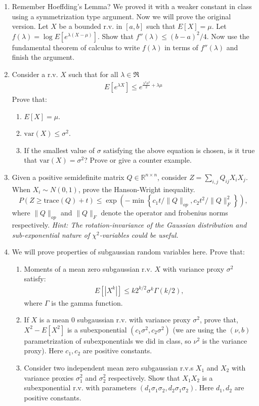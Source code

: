 \documentclass[11pt]{article}
\newcommand{\var}{\text{var}}
\begin{document}
\begin{enumerate}
\item Remember Hoeffding's Lemma? We proved it with a weaker constant in class using a symmetrization type argument. Now we will prove the original version. Let $X$ be a bounded r.v. in $[a,b]$ such that $E[X]=\mu$.
Let $f(\lambda)=\log E[e^{\lambda(X-\mu)}]$. Show that $f''(\lambda)\leq (b-a)^2/4$. Now use the fundamental theorem of calculus to write $f(\lambda)$ in terms of $f''(\lambda)$ and finish the argument.
\item Consider a r.v. $X$ such that for all $\lambda\in \Re$
\begin{align}
E[e^{\lambda X}]\leq e^{\frac{\lambda^2\sigma^2}{2}+\lambda\mu}
\end{align}
Prove that:
\begin{enumerate}
	\item $E[X]=\mu$.
	\item $\var(X)\leq \sigma^2$.
	\item If the smallest value of $\sigma$ satisfying the above equation is chosen, is it true that $\var(X)=\sigma^2$? Prove or give a counter example.
\end{enumerate}
\item Given a positive semidefinite matrix $Q\in \mathbb{R}^{n\times n}$, consider $Z=\sum_{i,j}Q_{ij}X_iX_j$. When $X_i\sim N(0,1)$, prove the Hanson-Wright inequality.
$$P\left(Z\ge \text{trace}(Q)+ t\right)\leq \exp\left(-\min\left\{c_1 t/\|Q\|_{op},c_2 t^2/\|Q\|_F^2\right\}\right),$$
where $\|Q\|_{op}$ and $\|Q\|_{F}$ denote the operator and frobenius norms respectively. \textit{Hint: The rotation-invariance of the
 Gaussian distribution and sub-exponential nature of $\chi^2$-variables could be useful.}
\item We will prove properties of subgaussian random variables here. Prove that:
\begin{enumerate}
\item Moments of a  mean zero subgaussian r.v. $X$ with variance proxy $\sigma^2$ satisfy:
\begin{align}
E[|X^{k}|]\leq k2^{k/2}\sigma^k \Gamma(k/2),
\end{align}
where $\Gamma$ is the gamma function. 
\item If $X$ is a mean 0 subgaussian r.v. with variance proxy $\sigma^2$, prove that,
$X^2-E[X^2]$ is a subexponential $(c_1\sigma^2,c_2\sigma^2)$ (we are using the $(\nu,b)$ parametrization of subexponentials we did in class, so $\nu^2$ is the variance proxy). Here $c_1,c_2$ are positive constants.
\item Consider two independent mean zero subgaussian r.v.s $X_1$ and $X_2$ with variance proxies $\sigma_1^2$ and $\sigma_2^2$ respectively. Show that $X_1X_2$ is a subexponential r.v. with parameters $(d_1\sigma_1\sigma_2, d_2\sigma_1\sigma_2)$. Here $d_1,d_2$ are positive constants.
\end{enumerate}
\end{enumerate}
\end{document}
